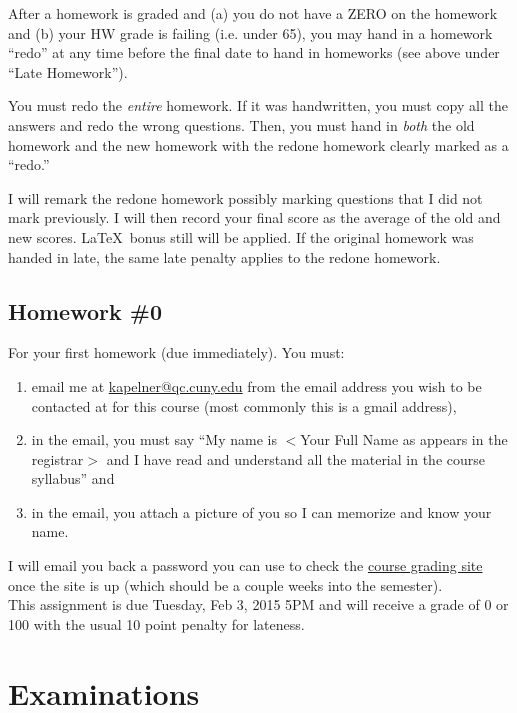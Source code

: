 \documentclass[12pt]{article}
\newcommand{\qu}[1]{``#1''}
\begin{document}
After a homework is graded and (a) you do not have a ZERO on the homework and (b) your HW grade is failing (i.e. under 65), you may hand in a homework \qu{redo} at any time before the final date to hand in homeworks (see above under \qu{Late Homework}). 

You must redo the \textit{entire} homework. If it was handwritten, you must copy all the answers and redo the wrong questions. Then, you must hand in \textit{both} the old homework and the new homework with the redone homework clearly marked as a \qu{redo.}

I will remark the redone homework possibly marking questions that I did not mark previously. I will then record your final score as the average of the old and new scores. \LaTeX~bonus still will be applied. If the original homework was handed in late, the same late penalty applies to the redone homework.

\subsection*{Homework \#0}

For your first homework (due immediately). You must:

\begin{enumerate}[(1)]
\item email me at \href{kapelner@qc.cuny.edu}{kapelner@qc.cuny.edu} from the email address you wish to be contacted at for this course (most commonly this is a gmail address),
\item in the email, you must say \qu{My name is $<$Your Full Name as appears in the registrar$>$ and I have read and understand all the material in the course syllabus} and
\item in the email, you attach a picture of you so I can memorize and know your name.
\end{enumerate}

I will email you back a password you can use to check the \href{http://qcgrades.com}{course grading site} once the site is up (which should be a couple weeks into the semester). \\

This assignment is due Tuesday, Feb 3, 2015 5PM and will receive a grade of 0 or 100 with the usual 10 point penalty for lateness.


\section*{Examinations}
\end{document}
